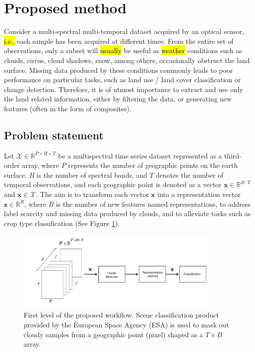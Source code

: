 \documentclass[journal,article,submit,pdftex,moreauthors]{Definitions/mdpi}
\begin{document}
\section{Proposed method}
Consider a multi-spectral multi-temporal dataset acquired by an optical sensor, \hl{i.e.,} each sample has been acquired at different times. From the entire set of observations, only a subset will \hl{usually} be useful as \hl{weather} conditions such as clouds, cirrus, cloud shadows, snow, among others, occasionally obstruct the land surface. 
Missing data produced by these conditions commonly leads to poor performance on particular tasks, such as land use / land cover classification or change detection.
Therefore, it is of utmost importance to extract and  use only the land related information, either by filtering the data, or generating new features (often in the form of composites).

\subsection{Problem statement}
Let $\mathscr{X} \in \mathbb{R}^{P \times B \times T}$ be a multispectral time series dataset represented as a third-order array, where $P$ represents the number of geographic points on the earth surface, $B$ is the number of spectral bands, and $T$ denotes the number of temporal observations, and each geographic point is denoted as a vector $\mathbf{x} \in \mathbb{R}^{B \cdot T}$ and $\mathbf{x} \in \mathscr{X}$. The aim is to transform each vector $\mathbf{x}$ into a representation vector $\mathbf{z} \in \mathbb{R}^{R}$, where $R$ is the number of new features named representations, to address label scarcity and missing data produced by clouds, and to alleviate tasks such as crop type classification (See Figure \ref{bigpicture}).

\begin{figure}[H]
	\centering
	\includegraphics[width=10cm]{figures/bigpicture_with_clement.pdf}
	\caption{First level of the proposed workflow. Scene classification product provided by the European Space Agency (ESA) is used to mask out cloudy samples from a geographic point (pixel) shaped as a $T \times B$ array. 
    }
	\label{bigpicture}
	\centering
\end{figure}
\end{document}
